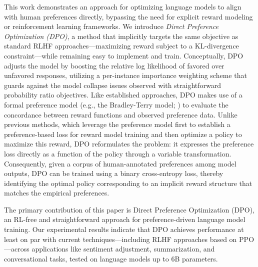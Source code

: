 This work demonstrates an approach for optimizing language models to align with human preferences directly, bypassing the need for explicit reward modeling or reinforcement learning frameworks. We introduce \textit{{Direct Preference Optimization} (DPO)}, a method that implicitly targets the same objective as standard RLHF approaches—maximizing reward subject to a KL-divergence constraint—while remaining easy to implement and train. Conceptually, DPO adjusts the model by boosting the relative log likelihood of favored over unfavored responses, utilizing a per-instance importance weighting scheme that guards against the model collapse issues observed with straightforward probability ratio objectives. Like established approaches, DPO makes use of a formal preference model (e.g., the Bradley-Terry model; \cite{bradley1952rankanalysis}) to evaluate the concordance between reward functions and observed preference data. Unlike previous methods, which leverage the preference model first to establish a preference-based loss for reward model training and then optimize a policy to maximize this reward, DPO reformulates the problem: it expresses the preference loss directly as a function of the policy through a variable transformation. Consequently, given a corpus of human-annotated preferences among model outputs, DPO can be trained using a binary cross-entropy loss, thereby identifying the optimal policy corresponding to an implicit reward structure that matches the empirical preferences.

The primary contribution of this paper is Direct Preference Optimization (DPO), an RL-free and straightforward approach for preference-driven language model training. Our experimental results indicate that DPO achieves performance at least on par with current techniques—including RLHF approaches based on PPO—across applications like sentiment adjustment, summarization, and conversational tasks, tested on language models up to 6B parameters.

